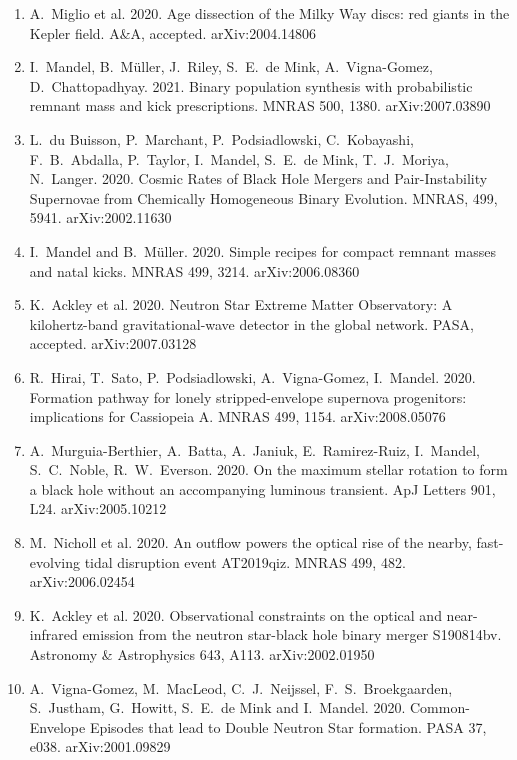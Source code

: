 \documentclass[margin,line]{res}
\begin{document}
\begin{resume}
\begin{enumerate}
\item A.~Miglio et al. 2020. Age dissection of the Milky Way discs: red giants in the Kepler field.  A\&A, accepted.  arXiv:2004.14806

\item I.~Mandel, B.~M\"{u}ller, J.~Riley, S.~E.~de Mink, A.~Vigna-Gomez, D.~Chattopadhyay. 2021.  Binary population synthesis with probabilistic remnant mass and kick prescriptions. MNRAS 500, 1380.   arXiv:2007.03890

\item L.~du Buisson, P.~Marchant, P.~Podsiadlowski, C.~Kobayashi, F.~B.~Abdalla, P.~Taylor, I.~Mandel, S.~E.~de Mink, T.~J.~Moriya, N.~Langer.  2020. Cosmic Rates of Black Hole Mergers and Pair-Instability Supernovae from Chemically Homogeneous Binary Evolution. MNRAS, 499, 5941.  arXiv:2002.11630

\item I.~Mandel and B.~M\"{u}ller. 2020. Simple recipes for compact remnant masses and natal kicks.  MNRAS 499, 3214.  arXiv:2006.08360

\item K.~Ackley et al. 2020. Neutron Star Extreme Matter Observatory: A kilohertz-band gravitational-wave detector in the global network. PASA, accepted.  arXiv:2007.03128 

\item R.~Hirai, T.~Sato, P.~Podsiadlowski, A.~Vigna-Gomez, I.~Mandel. 2020. Formation pathway for lonely stripped-envelope supernova progenitors: implications for Cassiopeia A.  MNRAS 499, 1154. arXiv:2008.05076

\item A.~Murguia-Berthier, A.~Batta, A.~Janiuk, E.~Ramirez-Ruiz, I.~Mandel, S.~C.~Noble, R.~W.~Everson.  2020.  On the maximum stellar rotation to form a black hole without an accompanying luminous transient.  ApJ Letters 901, L24.  arXiv:2005.10212

\item M.~Nicholl et al. 2020. An outflow powers the optical rise of the nearby, fast-evolving tidal disruption event AT2019qiz. MNRAS 499, 482.  arXiv:2006.02454

\item K.~Ackley et al. 2020. Observational constraints on the optical and near-infrared emission from the neutron star-black hole binary merger S190814bv.  Astronomy \& Astrophysics 643, A113.
arXiv:2002.01950

\item A.~Vigna-Gomez, M.~MacLeod, C.~J.~Neijssel, F.~S.~Broekgaarden, S.~Justham, G.~Howitt, S.~E.~de Mink and I.~Mandel.  2020. Common-Envelope Episodes that lead to Double Neutron Star formation.  PASA 37, e038.  arXiv:2001.09829 


\end{enumerate}
\end{resume}
\end{document}
